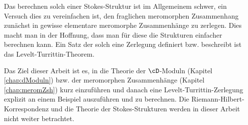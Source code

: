 Das berechnen solch einer Stokes-Struktur ist im Allgemeinem schwer, ein
Versuch dies zu vereinfachen ist, den fraglichen meromorphen Zusammenhang
zunächst in gewisse elementare meromorphe Zusammenhänge zu zerlegen.
Dies macht man in der Hoffnung, dass man für diese die Strukturen einfacher
berechnen kann.
Ein Satz der solch eine Zerlegung definiert bzw. beschreibt ist das
Levelt-Turrittin-Theorem.
\begin{comment}
Die Levelt-Turrittin-Zerlegung ist eine sogenannte Slope-Filtration. Diese
Klasse, der Slope-Filtrationen wird in \cite{0812.3921} betrachtet.
\end{comment}
Das Ziel dieser Arbeit ist es, in die Theorie der $\cD$-Moduln (Kapitel
\ref{chap:dModuln}) bzw. der meromorphen Zusammenhänge (Kapitel
\ref{chap:meromZsh}) kurz einzuführen und danach eine
Levelt-Turrittin-Zerlegung explizit an einem Beispiel auszuführen und zu
berechnen. Die Riemann-Hilbert-Korrespondenz und die Theorie der
Stokes-Strukturen werden in dieser Arbeit nicht weiter betrachtet.

\begin{comment}
Es wird in dieser Arbeit kein Vorwissen über $\cD$-Moduln bzw. meromorphe
Zusammenhänge vorausgesetzt, diese beiden Begriffe werden in den ersten Zwei
Kapiteln eingeführt.
\end{comment}

